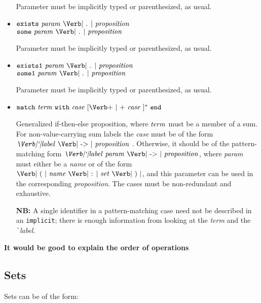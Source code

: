 \documentclass[11pt]{article}
\newcommand{\keywd}[1]{\mbox{\texttt{#1}}\xspace}
\newcommand{\END}{\keywd{end}}
\newcommand{\EXISTS}{\keywd{exists}}
\newcommand{\EXISTSONE}{\keywd{exists1}}
\newcommand{\IMPLICIT}{\keywd{implicit}}
\newcommand{\MATCH}{\keywd{match}}
\newcommand{\SOME}{\keywd{some}}
\newcommand{\SOMEONE}{\keywd{some1}}
\newcommand{\WITH}{\keywd{with}}
\newcommand{\metav}[1]{\mbox{\textit{#1}}\xspace}
\newcommand{\Case}{\metav{case}}
\newcommand{\Ident}{\metav{name}}
\newcommand{\Identifier}{\Ident}
\newcommand{\Label}{\metav{\Verb|`|label}}
\newcommand{\Setexp}{\metav{set}}
\newcommand{\Proposition}{\metav{proposition}}
\newcommand{\Param}{\metav{param}}
\newcommand{\Term}{\metav{term}}
\newcommand{\ARROW}{\mbox{\Verb| -> |}}
\newcommand{\BAR}{\mbox{\Verb+ | +}}
\newcommand{\COLON}{\mbox{\Verb| : |}}
\newcommand{\LPAREN}{\mbox{\Verb| ( |}}
\newcommand{\RPAREN}{\mbox{\Verb| ) |}}
\newcommand{\PERIOD}{\mbox{\Verb| . |}}
\newcommand{\NB}{\textbf{NB: }}
\begin{document}
\begin{itemize}
   Parameter must be implicitly typed or parenthesized, as usual.

\item $\EXISTS\ \Param\ \PERIOD\ \Proposition$\\
      $\SOME\ \Param\ \PERIOD\ \Proposition$

   Parameter must be implicitly typed or parenthesized, as usual.

\item $\EXISTSONE\ \Param\ \PERIOD\ \Proposition$\\
      $\SOMEONE\ \Param\ \PERIOD\ \Proposition$

   Parameter must be implicitly typed or parenthesized, as usual.

\item $\MATCH\ \Term\ \WITH\ \Case\ [\BAR\ \Case\ ]^*\ \END$
  
  Generalized if-then-else proposition, where
  $\Term$ must be a member of a sum.  For non-value-carrying
  sum labels the \Case must be of the form  $\Label\ \ARROW\
  \Proposition$ .  Otherwise, it should be of the pattern-matching
  form $\Label\ \Param\ \ARROW\ \Proposition$, where \Param must
  either be a \Ident or of the form $\LPAREN\ \Identifier\ \COLON\ 
  \Setexp\ \RPAREN$, and this parameter can be used in the
  corresponding \Proposition.  The cases must be non-redundant
  and exhaustive.
  
  \NB A single identifier in a pattern-matching case need not
  be described in an \IMPLICIT; there is enough information from
  looking at the \Term and the \Label.
\end{itemize}

\textbf{It would be good to explain the order of operations}

\subsection{Sets}

Sets can be of the form:
\end{document}

